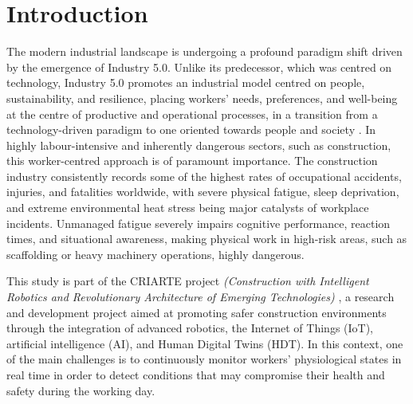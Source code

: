 \documentclass[a4paper,fleqn]{cas-sc}
\begin{document}
\maketitle

\section{Introduction}\label{sec:intro}

The modern industrial landscape is undergoing a profound paradigm shift driven by the emergence of Industry 5.0. Unlike its predecessor, which was centred on technology, Industry 5.0 promotes an industrial model centred on people, sustainability, and resilience, placing workers' needs, preferences, and well-being at the centre of productive and operational processes, in a transition from a technology-driven paradigm to one oriented towards people and society \cite{Leng2024}. In highly labour-intensive and inherently dangerous sectors, such as construction, this worker-centred approach is of paramount importance. The construction industry consistently records some of the highest rates of occupational accidents, injuries, and fatalities worldwide, with severe physical fatigue, sleep deprivation, and extreme environmental heat stress being major catalysts of workplace incidents. Unmanaged fatigue severely impairs cognitive performance, reaction times, and situational awareness, making physical work in high-risk areas, such as scaffolding or heavy machinery operations, highly dangerous.

This study is part of the CRIARTE project \textit{(Construction with Intelligent Robotics and Revolutionary Architecture of Emerging Technologies)} \cite{criarte_pt2030_2024}, a research and development project aimed at promoting safer construction environments through the integration of advanced robotics, the Internet of Things (IoT), artificial intelligence (AI), and Human Digital Twins (HDT). In this context, one of the main challenges is to continuously monitor workers' physiological states in real time in order to detect conditions that may compromise their health and safety during the working day.
\end{document}
